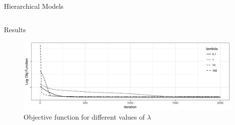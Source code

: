 \documentclass[final]{beamer}
\newlength{\onecolwid}
\newlength{\twocolwid}
\begin{document}
\begin{frame}[t]
\begin{columns}[t]
\begin{column}{\twocolwid}
\begin{columns}[t,totalwidth=\twocolwid]
\begin{column}{\onecolwid}
\begin{block}{Hierarchical Models}
\end{block}


\end{column} %

\end{columns} %




\begin{block}{Results}

\begin{figure}[h!]
   \centering
   \includegraphics[width=20in]{../R/plot_objective.png} %
   \caption{Objective function for different values of $\lambda$}
   \label{fig:example}
\end{figure}


\end{block}



\end{column}
\end{columns}
\end{frame}
\end{document}
